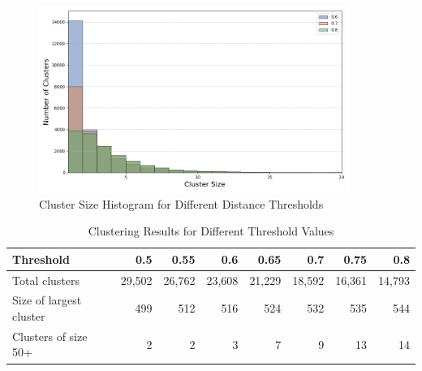 \documentclass[12pt,a4paper,titlepage,oneside,english]{article}
\begin{document}
\begin{figure}[h!]
	\centering
	\includegraphics[width=0.9\textwidth]{./figures/cluster_histogram.png}
	\caption{Cluster Size Histogram for Different Distance Thresholds}
	\label{fig:threshold_sensitivity}
\end{figure}


\begin{table}[h!]
\scriptsize
  \centering
  \begin{tabular}{lrrrrrrr}
    \hline
	\textbf{Threshold} & \textbf{0.5} & \textbf{0.55} &\textbf{0.6} & \textbf{0.65} & \textbf{0.7} & \textbf{0.75} & \textbf{0.8} \\
	\hline
Total clusters 			& 29,502 & 26,762 & 23,608 & 21,229 & 18,592 & 16,361 & 14,793 \\
Size of largest cluster & 499 & 	512 & 516 & 	524 & 532 & 535 & 544\\
Clusters of size 50+ 	& 2 & 2 & 3 & 7 & 9  & 13 & 14\\
    \hline
  \end{tabular}
  \caption{Clustering Results for Different Threshold Values}
  \label{tbl:cluster_table}
\end{table}
\end{document}
